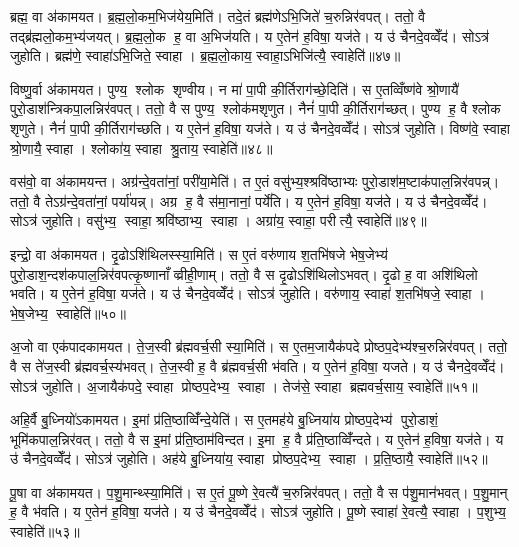 ब्रह्म॒ वा अ॑कामयत। ब्र॒ह्म॒लो॒कम॒भिज॑येय॒मिति॑। तदे॒तं ब्रह्म॑णेऽभि॒जिते॑ च॒रुन्निर॑वपत्। ततो॒ वै तद्ब्र॑ह्मलो॒कम॒भ्य॑जयत्। ब्र॒ह्म॒लो॒क ह॒ वा अ॒भिज॑यति। य ए॒तेन॑ ह॒विषा॒ यज॑ते। य उ॑ चैनदे॒वव्वेँद॑। सोऽत्र॑ जुहोति। ब्रह्म॑णे॒ स्वाहा॑ऽभि॒जिते॒ स्वाहा। ब्र॒ह्म॒लो॒काय॒ स्वाहा॒ऽभिजि॑त्यै॒ स्वाहेति॑॥४७॥

विष्णु॒र्वा अ॑कामयत। पुण्य॒ श्लोक शृण्वीय। न मा॑ पा॒पी की॒र्तिराग॑च्छे॒दिति॑। स ए॒तव्विँष्ण॑वे श्रो॒णायै॑ पुरो॒डाश॑न्त्रिकपा॒लन्निर॑वपत्। ततो॒ वै स पुण्य॒ श्लोक॑मशृणुत। नैनं॑ पा॒पी की॒र्तिराग॑च्छत्। पुण्य ह॒ वै श्लोक शृणुते। नैनं॑ पा॒पी की॒र्तिराग॑च्छति। य ए॒तेन॑ ह॒विषा॒ यज॑ते। य उ॑ चैनदे॒वव्वेँद॑। सोऽत्र॑ जुहोति। विष्ण॑वे॒ स्वाहा श्रो॒णायै॒ स्वाहा। श्लोका॑य॒ स्वाहा श्रु॒ताय॒ स्वाहेति॑॥४८॥

वस॑वो॒ वा अ॑कामयन्त। अग्र॑न्दे॒वता॑नां॒ परी॑या॒मेति॑। त ए॒तं वसु॑भ्य॒श्श्रवि॑ष्ठाभ्यः पुरो॒डाश॑म॒ष्टाक॑पाल॒न्निर॑वपन्न्। ततो॒ वै तेऽग्र॑न्दे॒वता॑नां॒ पर्या॑यन्न्। अग्र ह॒ वै स॑मा॒नानां॒ पर्ये॑ति। य ए॒तेन॑ ह॒विषा॒ यज॑ते। य उ॑ चैनदे॒वव्वेँद॑। सोऽत्र॑ जुहोति। वसु॑भ्य॒ स्वाहा॒ श्रवि॑ष्ठाभ्य॒ स्वाहा। अग्रा॑य॒ स्वाहा॒ परीत्यै॒ स्वाहेति॑॥४९॥

इन्द्रो॒ वा अ॑कामयत। दृ॒ढोऽशि॑थिलस्स्या॒मिति॑। स ए॒तं वरु॑णाय श॒तभि॑षजे भेष॒जेभ्य॑ पुरो॒डाश॒न्दश॑कपाल॒न्निर॑वपत्कृ॒ष्णानाँव्व्रीही॒णाम्। ततो॒ वै स दृ॒ढोऽशि॑थिलोऽभवत्। दृ॒ढो ह॒ वा अशि॑थिलो भवति। य ए॒तेन॑ ह॒विषा॒ यज॑ते। य उ॑ चैनदे॒वव्वेँद॑। सोऽत्र॑ जुहोति। वरु॑णाय॒ स्वाहा॑ श॒तभि॑षजे॒ स्वाहा। भे॒ष॒जेभ्य॒ स्वाहेति॑॥५०॥

अ॒जो वा एक॑पादकामयत। ते॒ज॒स्वी ब्र॑ह्मवर्च॒सी स्या॒मिति॑। स ए॒तम॒जायैक॑पदे प्रोष्ठप॒देभ्य॑श्च॒रुन्निर॑वपत्। ततो॒ वै स ते॑ज॒स्वी ब्र॑ह्मवर्च॒स्य॑भवत्। ते॒ज॒स्वी ह॒ वै ब्र॑ह्मवर्च॒सी भ॑वति। य ए॒तेन॑ ह॒विषा॒ यजते। य उ॑ चैनदे॒वव्वेँद॑। सोऽत्र॑ जुहोति। अ॒जायैक॑पदे॒ स्वाहा प्रोष्ठप॒देभ्य॒ स्वाहा। तेज॑से॒ स्वाहा ब्रह्मवर्च॒साय॒ स्वाहेति॑॥५१॥

अहि॒र्वै बु॒ध्नियो॑ऽकामयत। इ॒मां प्र॑ति॒ष्ठाव्विँ॑न्दे॒येति॑। स ए॒तमह॑ये बु॒ध्निया॑य प्रोष्ठप॒देभ्य॑ पुरो॒डाशं॒ भूमि॑कपाल॒न्निर॑वत्। ततो॒ वै स इ॒मां प्र॑ति॒ष्ठाम॑विन्दत। इ॒मा ह॒ वै प्र॑ति॒ष्ठाव्विँ॑न्दते। य ए॒तेन॑ ह॒विषा॒ यज॑ते। य उ॑ चैनदे॒वव्वेँद॑। सोऽत्र॑ जुहोति। अह॑ये बु॒ध्निया॑य॒ स्वाहा प्रोष्ठप॒देभ्य॒ स्वाहा। प्र॒ति॒ष्ठायै॒ स्वाहेति॑॥५२॥

पू॒षा वा अ॑कामयत। प॒शु॒मान्थ्स्या॒मिति॑। स ए॒तं पू॒ष्णे रे॒वत्यै॑ च॒रुन्निर॑वपत्। ततो॒ वै स प॑शु॒मान॑भवत्। प॒शु॒मान् ह॒ वै भ॑वति। य ए॒तेन॑ ह॒विषा॒ यज॑ते। य उ॑ चैनदे॒वव्वेँद॑। सोऽत्र॑ जुहोति। पू॒ष्णे स्वाहा॑ रे॒वत्यै॒ स्वाहा। प॒शुभ्य॒ स्वाहेति॑॥५३॥

